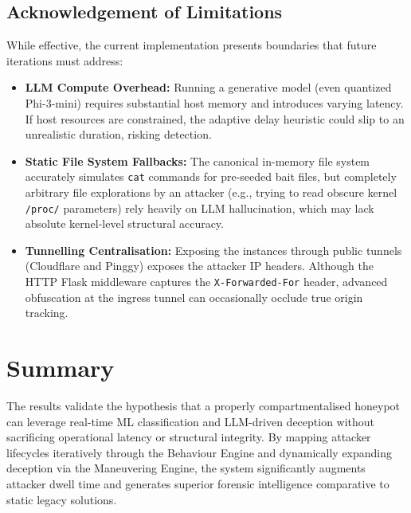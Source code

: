 \subsection{Acknowledgement of Limitations}
While effective, the current implementation presents boundaries that future iterations must address:
\begin{itemize}
    \item \textbf{LLM Compute Overhead:} Running a generative model (even quantized Phi-3-mini) requires substantial host memory and introduces varying latency. If host resources are constrained, the adaptive delay heuristic could slip to an unrealistic duration, risking detection.
    \item \textbf{Static File System Fallbacks:} The canonical in-memory file system accurately simulates \texttt{cat} commands for pre-seeded bait files, but completely arbitrary file explorations by an attacker (e.g., trying to read obscure kernel \texttt{/proc/} parameters) rely heavily on LLM hallucination, which may lack absolute kernel-level structural accuracy.
    \item \textbf{Tunnelling Centralisation:} Exposing the instances through public tunnels (Cloudflare and Pinggy) exposes the attacker IP headers. Although the HTTP Flask middleware captures the \texttt{X-Forwarded-For} header, advanced obfuscation at the ingress tunnel can occasionally occlude true origin tracking.
\end{itemize}

\section{Summary}

The results validate the hypothesis that a properly compartmentalised honeypot can leverage real-time ML classification and LLM-driven deception without sacrificing operational latency or structural integrity. By mapping attacker lifecycles iteratively through the Behaviour Engine and dynamically expanding deception via the Maneuvering Engine, the system significantly augments attacker dwell time and generates superior forensic intelligence comparative to static legacy solutions.
